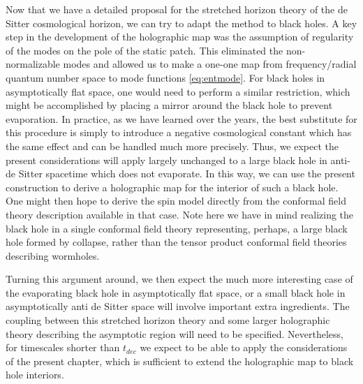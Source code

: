 \documentclass{brownthesis}
\begin{document}
Now that we have a detailed proposal for the stretched horizon theory
of the de Sitter cosmological horizon, we can try to adapt the method
to black holes. A key step in the development of the holographic map
was the assumption of regularity of the modes on the pole of the static
patch. This eliminated the non-normalizable modes and allowed us to
make a one-one map from frequency/radial quantum number space to mode
functions \eqref{eq:entmode}. For black holes in asymptotically flat
space, one would need to perform a similar restriction, which might
be accomplished by placing a mirror around the black hole to prevent
evaporation. In practice, as we have learned over the years, the best
substitute for this procedure is simply to introduce a negative cosmological
constant which has the same effect and can be handled much more precisely.
Thus, we expect the present considerations will apply largely unchanged
to a large black hole in anti-de Sitter spacetime which does not evaporate.
In this way, we can use the present construction to derive a holographic
map for the interior of such a black hole. One might then hope to
derive the spin model directly from the conformal field theory description
available in that case. Note here we have in mind realizing the black
hole in a single conformal field theory representing, perhaps, a large
black hole formed by collapse, rather than the tensor product conformal
field theories describing wormholes.

Turning this argument around, we then expect the much more interesting
case of the evaporating black hole in asymptotically flat space, or
a small black hole in asymptotically anti de Sitter space will involve
important extra ingredients. The coupling between this stretched horizon
theory and some larger holographic theory describing the asymptotic
region will need to be specified. Nevertheless, for timescales shorter
than $t_{dec}$ we expect to be able to apply the considerations of
the present chapter, which is sufficient to extend the holographic map
to black hole interiors.
\end{document}
